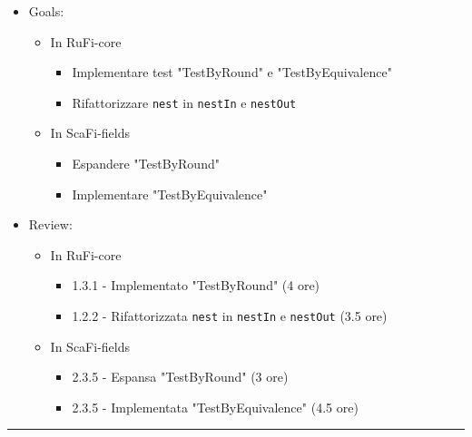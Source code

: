 \documentclass[12pt, a4paper]{article}
\begin{document}
\begin{itemize}
    \item Goals:
          \begin{itemize}
              \color{teal}
              \item In RuFi-core
                    \begin{itemize}
                        \item Implementare test "TestByRound" e "TestByEquivalence"
                        \item Rifattorizzare \texttt{nest} in \texttt{nestIn} e \texttt{nestOut}
                    \end{itemize}
                    \color{blue}

              \item In ScaFi-fields
                    \begin{itemize}
                        \item Espandere "TestByRound"
                        \item Implementare "TestByEquivalence"
                    \end{itemize}
          \end{itemize}
    \item Review:
          \begin{itemize}
              \color{teal}
              \item In RuFi-core
                    \begin{itemize}
                        \item 1.3.1 - Implementato "TestByRound" (4 ore)
                        \item 1.2.2 - Rifattorizzata \texttt{nest} in \texttt{nestIn} e \texttt{nestOut} (3.5 ore)
                    \end{itemize}
                    \color{blue}

              \item In ScaFi-fields
                    \begin{itemize}
                        \item 2.3.5 - Espansa "TestByRound" (3 ore)
                        \item 2.3.5 - Implementata "TestByEquivalence" (4.5 ore)
                    \end{itemize}
          \end{itemize}
\end{itemize}

\par\noindent\rule{\textwidth}{0.5pt}
\end{document}
